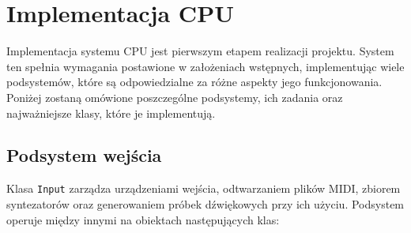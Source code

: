 \chapter{Implementacja CPU}
\label{chap:Implementacja CPU}
Implementacja systemu CPU jest pierwszym etapem realizacji projektu. System ten spełnia wymagania postawione w założeniach wstępnych, implementując wiele podsystemów, które są odpowiedzialne za różne aspekty jego funkcjonowania. Poniżej zostaną omówione poszczególne podsystemy, ich zadania oraz najważniejsze klasy, które je implementują.

\section{Podsystem wejścia}
Klasa \texttt{Input} zarządza urządzeniami wejścia, odtwarzaniem plików MIDI, zbiorem syntezatorów oraz generowaniem próbek dźwiękowych przy ich użyciu. Podsystem operuje między innymi na obiektach następujących klas:
